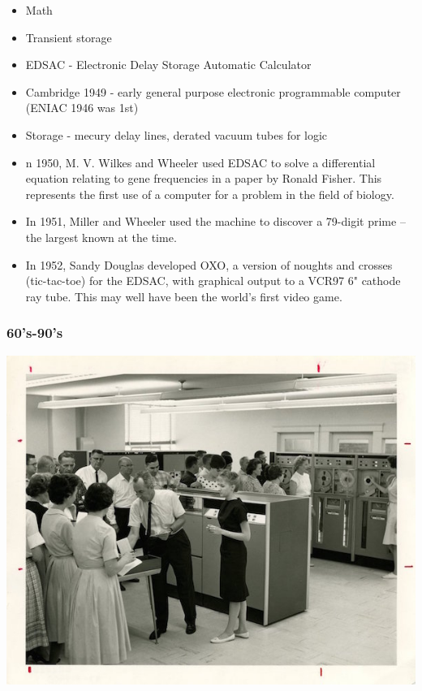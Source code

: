 \documentclass[11pt]{article}
\begin{document}
\begin{itemize}
\item Math
\item Transient storage
\end{itemize}

\begin{NOTES}
\begin{itemize}
\item EDSAC - Electronic Delay Storage Automatic Calculator
\item Cambridge 1949 - early general purpose electronic programmable computer (ENIAC 1946 was 1st)
\item Storage - mecury delay lines, derated vacuum tubes for logic
\item n 1950, M. V. Wilkes and Wheeler used EDSAC to solve a differential equation relating to gene frequencies in a paper by Ronald Fisher. This represents the first use of a computer for a problem in the field of biology.
\item In 1951, Miller and Wheeler used the machine to discover a 79-digit prime – the largest known at the time.
\item In 1952, Sandy Douglas developed OXO, a version of noughts and crosses (tic-tac-toe) for the EDSAC, with graphical output to a VCR97 6" cathode ray tube. This may well have been the world's first video game.
\end{itemize}
\end{NOTES}

\subsubsection*{60's-90's}
\label{sec:orgheadline6}

\includegraphics[width=.9\linewidth]{./1960s-computer.jpg}
\end{document}
